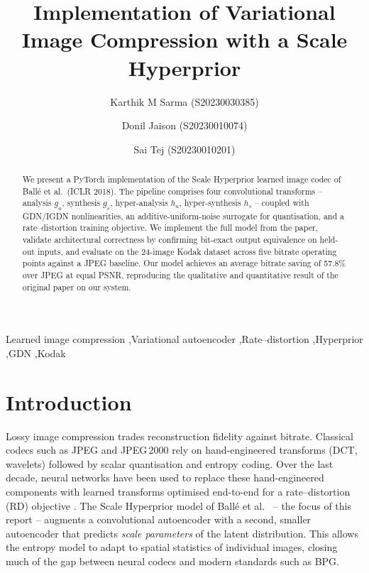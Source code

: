 \documentclass[review]{elsarticle}
\begin{document}
\begin{frontmatter}

\title{Implementation of Variational Image Compression with a Scale Hyperprior}

\author{Karthik M Sarma (S20230030385)}
\author{Donil Jaison (S20230010074)}
\author{Sai Tej (S20230010201)}

\address{Indian Institute of Information Technology, Sri City, Andhra Pradesh 517646, India \\
\textit{Project Supervisor: Dr. Priyambada Subudhi}}

\begin{abstract}
We present a PyTorch implementation of the Scale Hyperprior learned image codec of Ball\'e et al.\ (ICLR 2018). The pipeline comprises four convolutional transforms -- analysis $g_a$, synthesis $g_s$, hyper-analysis $h_a$, hyper-synthesis $h_s$ -- coupled with GDN/IGDN nonlinearities, an additive-uniform-noise surrogate for quantisation, and a rate--distortion training objective. We implement the full model from the paper, validate architectural correctness by confirming bit-exact output equivalence on held-out inputs, and evaluate on the 24-image Kodak dataset across five bitrate operating points against a JPEG baseline. Our model achieves an average bitrate saving of 57.8\% over JPEG at equal PSNR, reproducing the qualitative and quantitative result of the original paper on our system.
\end{abstract}

\begin{keyword}
Learned image compression \sep Variational autoencoder \sep Rate--distortion \sep Hyperprior \sep GDN \sep Kodak
\end{keyword}

\end{frontmatter}

\section{Introduction}
\label{sec:introduction}

Lossy image compression trades reconstruction fidelity against bitrate. Classical codecs such as JPEG and JPEG\,2000 rely on hand-engineered transforms (DCT, wavelets) followed by scalar quantisation and entropy coding. Over the last decade, neural networks have been used to replace these hand-engineered components with learned transforms optimised end-to-end for a rate--distortion (RD) objective \cite{balle2017,theis2017,balle2018}. The Scale Hyperprior model of Ball\'e et al.\ \cite{balle2018} -- the focus of this report -- augments a convolutional autoencoder with a second, smaller autoencoder that predicts \emph{scale parameters} of the latent distribution. This allows the entropy model to adapt to spatial statistics of individual images, closing much of the gap between neural codecs and modern standards such as BPG.
\end{document}
